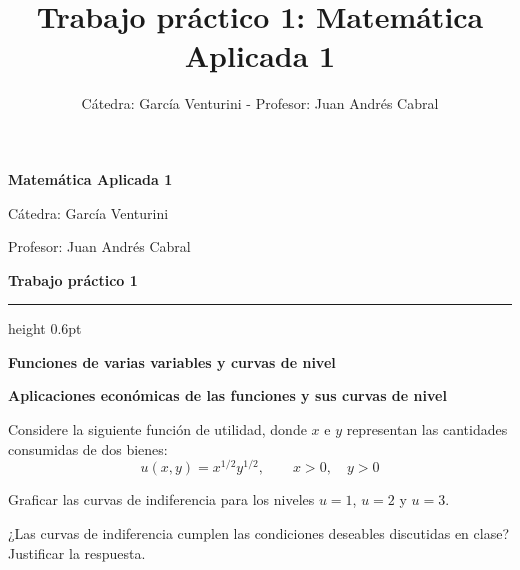 \documentclass[a4paper,11pt]{article}
\title{Trabajo práctico 1: Matemática Aplicada 1}
\author{Cátedra: García Venturini - Profesor: Juan Andrés Cabral}
\date{}
\newcommand{\seccionguia}[1]{%
    \par\addvspace{0.45cm}
    \Needspace{4\baselineskip}
    \noindent
    \colorbox{fondoseccion}{%
        \parbox{\dimexpr\linewidth-2\fboxsep\relax}{%
            \raggedright
            \strut\textbf{#1}\strut
        }%
    }%
    \par\nobreak\vspace{0.15cm}
}
\begin{document}

{\centering
    {\Large\bfseries Matemática Aplicada 1\par}
    \vspace{0.12cm}
    {\normalsize Cátedra: García Venturini\par}
    \vspace{0.05cm}
    {\normalsize Profesor: Juan Andrés Cabral\par}
    \vspace{0.20cm}
    {\large\bfseries Trabajo práctico 1\par}
}

\vspace{0.20cm}
{\color{colormarco}\hrule height 0.6pt}


\seccionguia{Funciones de varias variables y curvas de nivel}

%
%
%
%
%


\seccionguia{Aplicaciones económicas de las funciones y sus curvas de nivel}
\begin{ejercicios}[resume=guia]

    \item Considere la siguiente función de utilidad, donde \(x\) e \(y\)
    representan las cantidades consumidas de dos bienes:
    \[
    u(x,y)=x^{1/2}y^{1/2},
    \qquad x>0,\quad y>0
    \]

    \begin{incisos}
        \item Graficar las curvas de indiferencia para los niveles
        \(u=1\), \(u=2\) y \(u=3\).

        \item ¿Las curvas de indiferencia cumplen las condiciones
        deseables discutidas en clase? Justificar la respuesta.
    \end{incisos}

\end{ejercicios}
\end{document}
